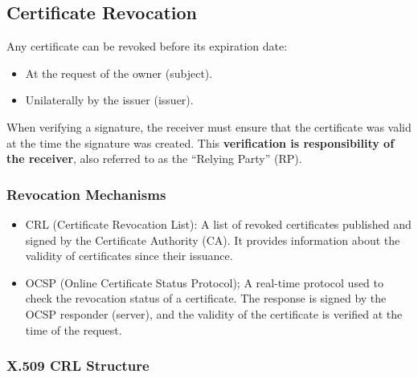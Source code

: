 \subsection{Certificate Revocation}
Any certificate can be revoked before its expiration date:
\begin{itemize}
\item At the request of the owner (subject).
\item Unilaterally by the issuer (issuer).
\end{itemize}
When verifying a signature, the receiver must ensure that the certificate was valid at the time the signature was created. This \textbf{verification is responsibility of the receiver}, also referred to as the “Relying Party” (RP).

\subsubsection*{Revocation Mechanisms}
\begin{itemize}
    \item CRL (Certificate Revocation List):
    A list of revoked certificates published and signed by the Certificate Authority (CA). It provides information about the validity of certificates since their issuance.
    \item OCSP (Online Certificate Status Protocol);  
A real-time protocol used to check the revocation status of a certificate. The response is signed by the OCSP responder (server), and the validity of the certificate is verified at the time of the request.  
\end{itemize}

\clearpage

\subsubsection*{X.509 CRL Structure}

